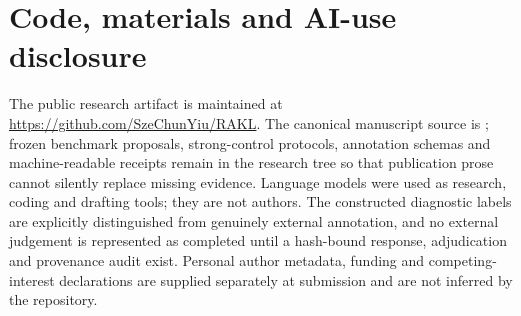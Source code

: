\documentclass[11pt]{article}
\begin{document}
\section*{Code, materials and AI-use disclosure}
\begin{sloppypar}
The public research artifact is maintained at \url{https://github.com/SzeChunYiu/RAKL}. The canonical manuscript source is ; frozen benchmark proposals, strong-control protocols, annotation schemas and machine-readable receipts remain in the research tree so that publication prose cannot silently replace missing evidence. Language models were used as research, coding and drafting tools; they are not authors. The constructed diagnostic labels are explicitly distinguished from genuinely external annotation, and no external judgement is represented as completed until a hash-bound response, adjudication and provenance audit exist. Personal author metadata, funding and competing-interest declarations are supplied separately at submission and are not inferred by the repository.
\end{sloppypar}


\end{document}

